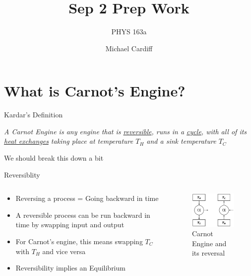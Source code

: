 \documentclass{beamer}
\title{Sep 2 Prep Work}
\author{Michael Cardiff}
\subtitle{PHYS 163a}
\begin{document}
\begin{frame}
  \titlepage
\end{frame}

\section{What is Carnot's Engine?}
\begin{frame}{Kardar's Definition}
  \begin{center}
    \textit{A Carnot Engine is any engine that is \underline{reversible}, runs in a \underline{cycle}, with all of its \underline{heat exchanges} taking place at temperature $T_H$ and a sink temperature $T_C$}
  \end{center}
  We should break this down a bit
\end{frame}

\begin{frame}{Reversiblity}
  \begin{columns}
    \begin{column}{0.5\textwidth}
      \begin{itemize}
      \item Reversing a process = Going backward in time
      \item A reversible process can be run backward in time by swapping input and output
      \item For Carnot's engine, this means swapping $T_C$ with $T_H$ and vice versa
      \item Reversibility implies an Equilibrium
      \end{itemize}
    \end{column}
    \begin{column}{0.5\textwidth}
      \begin{figure}[H]
        \centering
        \includegraphics[width=5.0cm]{carnot.png}
        \caption{Carnot Engine and its reversal}
      \end{figure}
    \end{column}
  \end{columns}
  
\end{frame}
\end{document}
